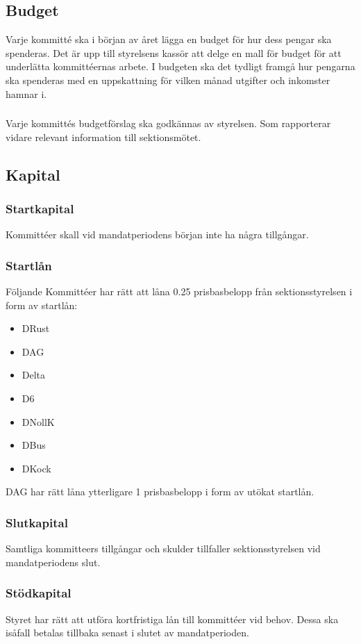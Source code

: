 \documentclass[a4paper, 10pt]{article}
\def\roundandprint #1{\xinttheiexpr #1\relax }
\newcommand{\prisbasbelopp}[1]{
    #1 prisbasbelopp
    \ifdef{\nuvarandeprisbasbelopp}{
        \marginpar{
            \small{ \textbf{\roundandprint{\xintiexpr#1 * \nuvarandeprisbasbelopp\relax}kr}}
        }
    }{}
}
\begin{document}
\subsection{Budget}
\label{sec:budget}
Varje kommitté ska i början av året lägga en budget för hur dess pengar ska spenderas. Det är upp till styrelsens kassör att delge en mall för budget för att underlätta kommittéernas arbete. I budgeten ska det tydligt framgå hur pengarna ska spenderas med en uppskattning för vilken månad utgifter och inkomster hamnar i.

\subsubsection{}
Varje kommittés budgetförslag ska godkännas av styrelsen. Som rapporterar vidare relevant information till sektionsmötet.


\subsection{Kapital}
\label{sec:sektionsforeningar_startkapital}
\subsubsection{Startkapital}
Kommittéer skall vid mandatperiodens början inte ha några tillgångar.
\subsubsection{Startlån}
Följande Kommittéer har rätt att låna \prisbasbelopp{0.25} från sektionsstyrelsen i form av startlån:
\begin{itemize}
  \item DRust
  \item DAG
  \item Delta
  \item D6
  \item DNollK
  \item DBus
  \item DKock
\end{itemize}
DAG har rätt låna ytterligare \prisbasbelopp{1} i form av utökat startlån.
\subsubsection{Slutkapital}
Samtliga kommitteers tillgångar och skulder tillfaller sektionsstyrelsen vid mandatperiodens slut.
\subsubsection{Stödkapital}
Styret har rätt att utföra kortfristiga lån till kommittéer vid behov. Dessa ska isåfall betalas tillbaka senast i slutet av mandatperioden.
\end{document}
